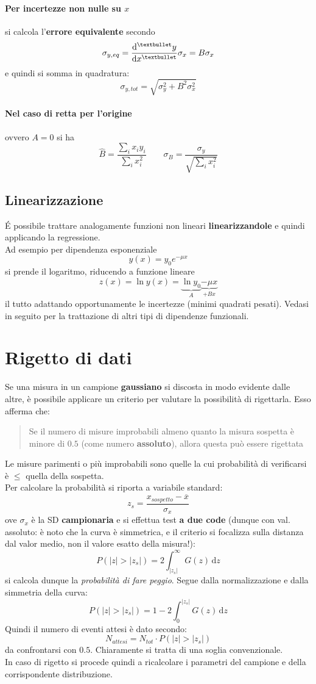 \documentclass[10pt, oneside]{book}
\begin{document}
\paragraph{Per incertezze non nulle su $x$} si calcola l'\textbf{errore equivalente} secondo
\[\sigma_{y,eq} = \dv[•]{y}{x} \sigma_x = B \sigma_x\]
e quindi si somma in quadratura:
\[\sigma_{y,tot} = \sqrt{\sigma_y^2 + B^2 \sigma_x^2}\]
\paragraph{Nel caso di retta per l'origine} ovvero $A = 0$ si ha
\[\hat{B} = \frac{\sum_i x_i y_i}{\sum_i x_i^2} \qquad \sigma_B = \frac{\sigma_y}{\sqrt{\sum_i x_i^2}}\]

\subsection{Linearizzazione}
\'E possibile trattare analogamente funzioni non lineari \textbf{linearizzandole} e quindi applicando la regressione.\\
Ad esempio per dipendenza esponenziale
\[y(x) = y_0 e^{-\mu x}\]
si prende il logaritmo, riducendo a funzione lineare
\[z(x) = \ln y(x) = \underbrace{\ln y_0}_{A} \underbrace{ - \mu x}_{+Bx} \]
il tutto adattando opportunamente le incertezze (minimi quadrati pesati). Vedasi in seguito per la trattazione di altri tipi di dipendenze funzionali.

\section{Rigetto di dati}
Se una misura in un campione \textbf{gaussiano} si discosta in modo evidente dalle altre, è possibile applicare un criterio per valutare la possibilità di rigettarla. Esso afferma che:
\begin{quote}
Se il numero di misure improbabili almeno quanto la misura sospetta è minore di $0.5$ (come numero \textbf{assoluto}), allora questa può essere rigettata
\end{quote} 
Le misure parimenti o più improbabili sono quelle la cui probabilità di verificarsi è $\leq$ quella della sospetta.\\
Per calcolare la probabilità si riporta a variabile standard:
\[z_s = \frac{x_{sospetto} - \overline{x}}{\sigma_x}\]
ove $\sigma_x$ è la SD \textbf{campionaria} e si effettua test \textbf{a due code} (dunque con val. assoluto: è noto che la curva è simmetrica, e il criterio si focalizza sulla distanza dal valor medio, non il valore esatto della misura!):
\[P(|z| > |z_s|) = 2 \int_{|z_s|}^{\infty}G(z)\,\mathrm{d}z\]
si calcola dunque la \textit{probabilità di fare peggio}. Segue dalla normalizzazione e dalla simmetria della curva:
\[P(|z| > |z_s|) = 1 - 2 \int_{0}^{|z_s|}G(z)\,\mathrm{d}z\]
Quindi il numero di eventi attesi è dato secondo:
\[N_{attesi} = N_{tot} \cdot P(|z| > |z_s|)\]
da confrontarsi con $0.5$. Chiaramente si tratta di una soglia convenzionale.\\
In caso di rigetto si procede quindi a ricalcolare i parametri del campione e della corrispondente distribuzione.
\end{document}
